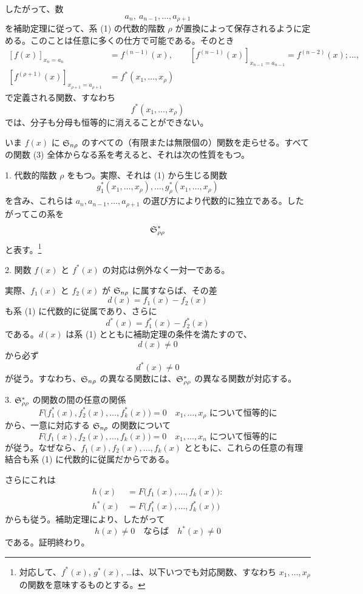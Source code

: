 \documentclass[11pt]{article}
\begin{document}
したがって、数
\[
  a_n,\ a_{n-1},\ldots,a_{\rho+1}
\]
を補助定理に従って、系 (1) の代数的階数 $\rho$ が置換によって保存されるように定める。このことは任意に多くの仕方で可能である。そのとき
\[
\begin{aligned}
 [f(x)]_{x_n=a_n}&=f^{(n-1)}(x),\qquad
 [f^{(n-1)}(x)]_{x_{n-1}=a_{n-1}}=f^{(n-2)}(x);\ldots,\\
 [f^{(\rho+1)}(x)]_{x_{\rho+1}=a_{\rho+1}}&=f^*(x_1,\ldots,x_\rho)
\end{aligned}
\]
で定義される関数、すなわち
\begin{equation}
  f^*(x_1,\ldots,x_\rho)
\tag{3}
\end{equation}
では、分子も分母も恒等的に消えることができない。

いま $f(x)$ に $\mathfrak{S}_{n\rho}$ のすべての（有限または無限個の）関数を走らせる。すべての関数 (3) 全体からなる系を考えると、それは次の性質をもつ。

1. 代数的階数 $\rho$ をもつ。実際、それは (1) から生じる関数
\[
  g_1^*(x_1,\ldots,x_\rho),\ldots,g_\rho^*(x_1,\ldots,x_\rho)
\]
を含み、これらは $a_n,a_{n-1},\ldots,a_{\rho+1}$ の選び方により代数的に独立である。したがってこの系を
\[
  \mathfrak{S}^*_{\rho\rho}
\]
と表す。\footnote{対応して、$f^*(x)$, $g^*(x)$, \ldots は、以下いつでも対応関数、すなわち $x_1,\ldots,x_\rho$ の関数を意味するものとする。}

2. 関数 $f(x)$ と $f^*(x)$ の対応は例外なく一対一である。

実際、$f_1(x)$ と $f_2(x)$ が $\mathfrak{S}_{n\rho}$ に属すならば、その差
\[
  d(x)=f_1(x)-f_2(x)
\]
も系 (1) に代数的に従属であり、さらに
\[
  d^*(x)=f_1^*(x)-f_2^*(x)
\]
である。$d(x)$ は系 (1) とともに補助定理の条件を満たすので、
\[
  d(x)\ne0
\]
から必ず
\[
  d^*(x)\ne0
\]
が従う。すなわち、$\mathfrak{S}_{n\rho}$ の異なる関数には、$\mathfrak{S}^*_{\rho\rho}$ の異なる関数が対応する。

3. $\mathfrak{S}^*_{\rho\rho}$ の関数の間の任意の関係
\[
  F\bigl(f_1^*(x),f_2^*(x),\ldots,f_k^*(x)\bigr)=0
  \quad\text{$x_1,\ldots,x_\rho$ について恒等的に}
\]
から、一意に対応する $\mathfrak{S}_{n\rho}$ の関数について
\[
  F\bigl(f_1(x),f_2(x),\ldots,f_k(x)\bigr)=0
  \quad\text{$x_1,\ldots,x_n$ について恒等的に}
\]
が従う。なぜなら、$f_1(x),f_2(x),\ldots,f_k(x)$ とともに、これらの任意の有理結合も系 (1) に代数的に従属だからである。

さらにこれは
\begin{equation}
\begin{aligned}
 h(x)&=F\bigl(f_1(x),\ldots,f_k(x)\bigr):\\
 h^*(x)&=F\bigl(f_1^*(x),\ldots,f_k^*(x)\bigr)
\end{aligned}
\tag{4}
\end{equation}
からも従う。補助定理により、したがって
\[
  h(x)\ne0\quad\text{ならば}\quad h^*(x)\ne0
\]
である。証明終わり。
\end{document}
